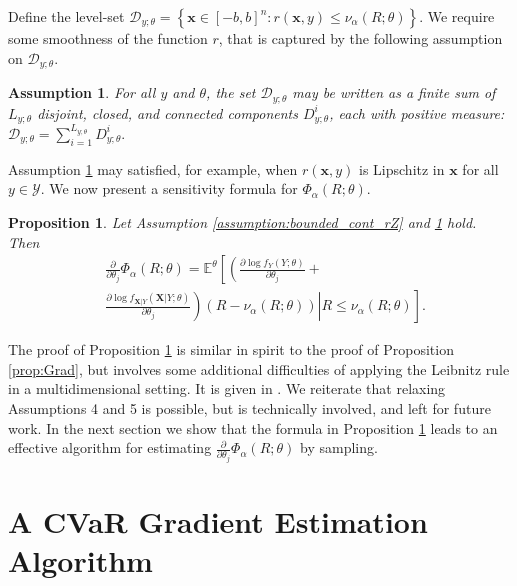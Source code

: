 \documentclass[letterpaper]{article}
\newcommand{\E}{\mathbb{E}}
\newcommand{\cvar}{\Phi_\alpha}
\newcommand{\var}{\nu_\alpha}
\newcommand{\cD}{\mathcal{D}}
\newcommand{\cY}{\mathcal{Y}}
\newcommand{\bx}{\mathbf{x}}
\newcommand{\bX}{\mathbf{X}}
\newcommand{\Dth}{\frac{\partial}{\partial \theta_j}}
\newtheorem{assumption}{Assumption}
\newtheorem{proposition}[theorem]{Proposition}
\begin{document}
Define the level-set
$
\cD_{y;\theta} = \left\{ \bx \in [-b,b]^n : r(\bx,y)\leq \var(R;\theta) \right\}.
$
We require some smoothness of the function $r$, that is captured by the following assumption on $\cD_{y;\theta}$.
\begin{assumption}\label{assumption:D_finite_sum}
For all $y$ and $\theta$, the set $\cD_{\!y;\theta}$ may be written as a finite sum of $L_{y;\theta}$ disjoint, closed, and connected components $D_{\!y;\theta}^i$, each with positive measure:
$
\cD_{\!y;\theta} \!=\! \sum_{i=1}^{L_{y;\theta}} D_{\!y;\theta}^i.
$
\end{assumption}
Assumption \ref{assumption:D_finite_sum} may satisfied, for example, when $r(\bx,y)$ is Lipschitz in $\bx$ for all $y\in \cY$.
We now present a sensitivity formula for $\cvar (R;\theta)$.
\begin{proposition}\label{prop:grad_general}
Let Assumption \ref{assumption:bounded_cont_rZ} and \ref{assumption:D_finite_sum} hold. Then
\begin{equation*}
\begin{split}
&\Dth \cvar (R;\theta) = \E^{\theta}\left[\left(\frac{\partial {\log f_Y(Y;\theta)}}{\partial \theta_j}+ \right.\right.\\
&\left.\left.\left. \frac{\partial {\log f_{\bX|Y}(\bX|Y;\theta)}}{\partial \theta_j}\right)\left(R - \var (R;\theta)\right)\right| R  \leq  \var (R;\theta)\right].
\end{split}
\end{equation*}
\end{proposition}

The proof of Proposition \ref{prop:grad_general} is similar in spirit to the proof of Proposition \ref{prop:Grad}, but involves some additional difficulties of applying the Leibnitz rule in a multidimensional setting. It is given in \cite{tamar2014cvar}. We reiterate that relaxing Assumptions 4 and 5 is possible, but is technically involved, and left for future work. In the next section we show that the formula in Proposition \ref{prop:grad_general} leads to an effective algorithm for estimating $\Dth \cvar (R;\theta)$ by sampling.
\section{A CVaR Gradient Estimation Algorithm}\label{sec:CVaR_Algorithm}
\end{document}
